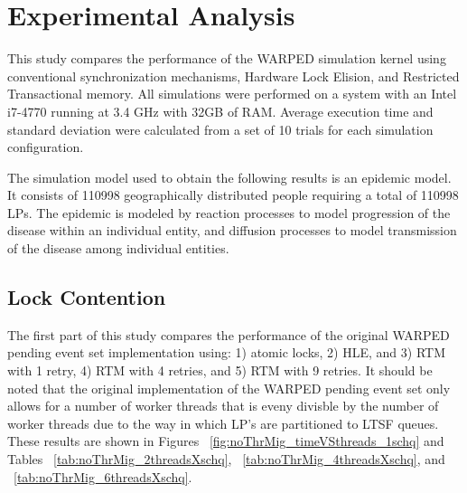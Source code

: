 \documentclass[a4paper]{article}
\begin{document}
\newpage
\section{\textbf{Experimental Analysis}}

This study compares the performance of the WARPED simulation kernel
using conventional synchronization mechanisms, Hardware Lock Elision, and
Restricted Transactional memory.  All simulations were performed on a system
with an Intel i7-4770 running at 3.4 GHz with 32GB of RAM.  Average execution
time and standard deviation were calculated from a set of 10 trials for each
simulation configuration.\par

The simulation model used to obtain the following results is an epidemic
model.  It consists of 110998 geographically distributed people
requiring a total of 110998 LPs.  The epidemic is modeled by reaction processes
to model progression of the disease within an individual entity, and diffusion
processes to model transmission of the disease among individual entities.\par

%

\subsection{\textbf{Lock Contention}}

The first part of this study compares the performance of the original WARPED
pending event set implementation using: 1) atomic locks, 2) HLE, and 3) RTM with
1 retry, 4) RTM with 4 retries, and 5) RTM with 9 retries.  It should be noted
that the original implementation of the WARPED pending event set only allows for
a number of worker threads that is eveny divisble by the number of worker
threads due to the way in which LP's are partitioned to LTSF queues.  These
results are shown in Figures ~\ref{fig:noThrMig_timeVSthreads_1schq} and Tables
~\ref{tab:noThrMig_2threadsXschq}, ~\ref{tab:noThrMig_4threadsXschq}, and
~\ref{tab:noThrMig_6threadsXschq}.\par
\end{document}
